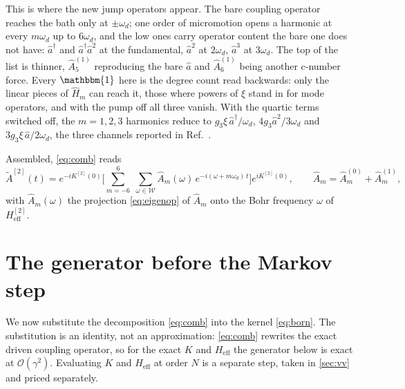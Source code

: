 \documentclass[a4paper,11pt]{article}
\newcommand{\id}{\mathbbm{1}}
\newcommand{\eff}{\mathrm{eff}}
\begin{document}
\begin{example}
This is where the new jump operators appear. The bare coupling operator reaches the bath only at $\pm\omega_d$; one order of micromotion opens a harmonic at every $m\omega_d$ up to $6\omega_d$, and the low ones carry operator content the bare one does not have: $\hat a^\dagger$ and $\hat a^\dagger\hat a^2$ at the fundamental, $\hat a^2$ at $2\omega_d$, $\hat a^3$ at $3\omega_d$. The top of the list is thinner, $\hat A^{(1)}_5$ reproducing the bare $\hat a$ and $\hat A^{(1)}_6$ being another c-number force. Every $\id$ here is the degree count read backwards: only the linear pieces of $\hat H_m$ can reach it, those where powers of $\xi$ stand in for mode operators, and with the pump off all three vanish. With the quartic terms switched off, the $m=1,2,3$ harmonics reduce to $g_3\xi\,\hat a^\dagger/\omega_d$, $4g_3\hat a^2/3\omega_d$ and $3g_3\xi\,\hat a/2\omega_d$, the three channels reported in Ref.~\cite{Venkatraman2024Nonlinear}.

Assembled, \eqref{eq:comb} reads
\begin{equation}\label{eq:kpo-comb}
  \tilde A^{[2]}(t) = e^{-iK^{[2]}(0)}\Big[\sum_{m=-6}^{6}\;\sum_{\omega\in\mathcal W}
  \hat A_m(\omega)\,e^{-i(\omega + m\omega_d)\,t}\Big]e^{iK^{[2]}(0)},
  \qquad
  \hat A_m = \hat A^{(0)}_m + \hat A^{(1)}_m ,
\end{equation}
with $\hat A_m(\omega)$ the projection \eqref{eq:eigenop} of $\hat A_m$ onto the Bohr frequency $\omega$ of $H_\eff^{[2]}$. 
\end{example}

\section{The generator before the Markov step}\label{sec:preclosure}

We now substitute the decomposition \eqref{eq:comb} into the kernel \eqref{eq:born}. The substitution is an identity, not an approximation: \cref{eq:comb} rewrites the exact driven coupling operator, so for the exact $K$ and $H_\eff$ the generator below is exact at $\mathcal O(\gamma^2)$. Evaluating $K$ and $H_\eff$ at order $N$ is a separate step, taken in \cref{sec:vv} and priced separately.
\end{document}

